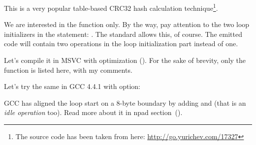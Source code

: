 \label{sec:CRC32}

\newcommand{\URLCRCSRC}{\url{http://go.yurichev.com/17327}}

This is a very popular table-based CRC32 hash calculation 
technique\footnote{The source code has been taken from here: \URLCRCSRC}.




We are interested in the  function only.
By the way, pay attention to the two loop initializers in the  statement: .
The \CCpp standard allows this, of course.
The emitted code will contain two operations in the loop initialization part
instead of one.

Let's compile it in MSVC with optimization (\Ox).
For the sake of brevity, only the  function is listed here, with my comments.



Let's try the same in GCC 4.4.1 with \Othree option:




GCC has aligned the loop start on a 8-byte boundary by adding \NOP and 
(that is an \emph{idle operation} too).
Read more about it in npad section~().


